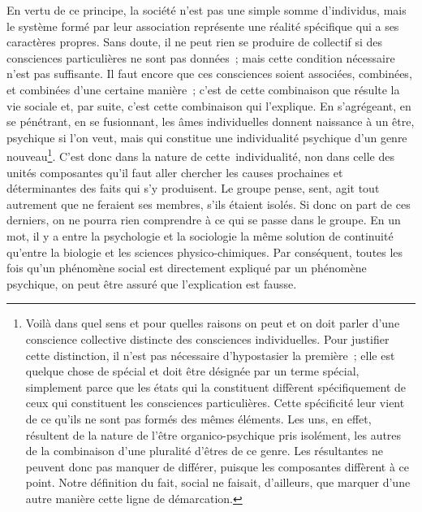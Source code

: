 \documentclass[french,twoside]{book} %
\begin{document}
En vertu de ce principe, la société n’est pas une simple somme d’individus, mais le système formé par leur association représente une réalité spécifique qui a ses caractères propres. Sans doute, il ne peut rien se produire de collectif si des consciences particulières ne sont pas données ; mais cette condition nécessaire n’est pas suffisante. Il faut encore que ces consciences soient associées, combinées, et combinées d’une certaine manière ; c’est de cette combinaison que résulte la vie sociale et, par suite, c’est cette combinaison qui l’explique. En s’agrégeant, en se pénétrant, en se fusionnant, les âmes individuelles donnent naissance à un être, psychique si l’on veut, mais qui constitue une individualité psychique d’un genre nouveau\footnote{ Voilà dans quel sens et pour quelles raisons on peut et on doit parler d’une conscience collective distincte des consciences individuelles. Pour justifier cette distinction, il n’est pas nécessaire d’hypostasier la première ; elle est quelque chose de spécial et doit être désignée par un terme spécial, simplement parce que les états qui la constituent diffèrent spécifiquement de ceux qui constituent les consciences particulières. Cette spécificité leur vient de ce qu’ils ne sont pas formés des mêmes éléments. Les uns, en effet, résultent de la nature de l’être organico-psychique pris isolément, les autres de la combinaison d’une pluralité d’êtres de ce genre. Les résultantes ne peuvent donc pas manquer de différer, puisque les composantes diffèrent à ce point. Notre définition du fait, social ne faisait, d’ailleurs, que marquer d’une autre manière cette ligne de démarcation.}. C’est donc dans la nature de cette individualité, non dans celle des unités composantes qu’il faut aller chercher les causes prochaines et déterminantes des faits qui s’y produisent. Le groupe pense, sent, agit tout autrement que ne feraient ses membres, s’ils étaient isolés. Si donc on part de ces derniers, on ne pourra rien comprendre à ce qui se passe dans le groupe. En un mot, il y a entre la psychologie et la sociologie la même solution de continuité qu’entre la biologie et les sciences physico-chimiques. Par conséquent, toutes les fois qu’un phénomène social est directement expliqué par un phénomène psychique, on peut être assuré que l’explication est fausse.\par
\end{document}
